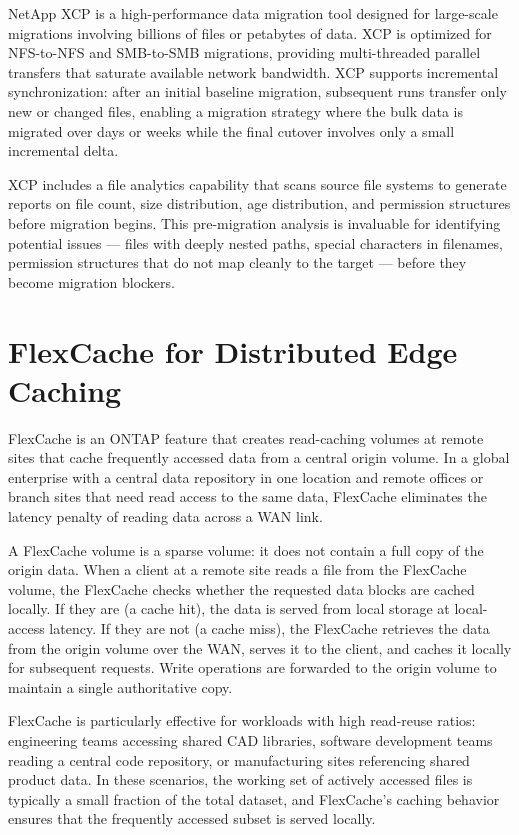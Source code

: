 NetApp XCP is a high-performance data migration tool designed for large-scale
migrations involving billions of files or petabytes of data. XCP is optimized
for NFS-to-NFS and SMB-to-SMB migrations, providing multi-threaded parallel
transfers that saturate available network bandwidth. XCP supports incremental
synchronization: after an initial baseline migration, subsequent runs transfer
only new or changed files, enabling a migration strategy where the bulk data
is migrated over days or weeks while the final cutover involves only a small
incremental delta.

XCP includes a file analytics capability that scans source file systems to
generate reports on file count, size distribution, age distribution, and
permission structures before migration begins. This pre-migration analysis is
invaluable for identifying potential issues --- files with deeply nested
paths, special characters in filenames, permission structures that do not map
cleanly to the target --- before they become migration blockers.

\section{FlexCache for Distributed Edge Caching}

FlexCache is an ONTAP feature that creates read-caching volumes at remote
sites that cache frequently accessed data from a central origin volume. In a
global enterprise with a central data repository in one location and remote
offices or branch sites that need read access to the same data, FlexCache
eliminates the latency penalty of reading data across a WAN link.

A FlexCache volume is a sparse volume: it does not contain a full copy of the
origin data. When a client at a remote site reads a file from the FlexCache
volume, the FlexCache checks whether the requested data blocks are cached
locally. If they are (a cache hit), the data is served from local storage at
local-access latency. If they are not (a cache miss), the FlexCache retrieves
the data from the origin volume over the WAN, serves it to the client, and
caches it locally for subsequent requests. Write operations are forwarded to
the origin volume to maintain a single authoritative copy.

FlexCache is particularly effective for workloads with high read-reuse ratios:
engineering teams accessing shared CAD libraries, software development teams
reading a central code repository, or manufacturing sites referencing shared
product data. In these scenarios, the working set of actively accessed files
is typically a small fraction of the total dataset, and FlexCache's caching
behavior ensures that the frequently accessed subset is served locally.

